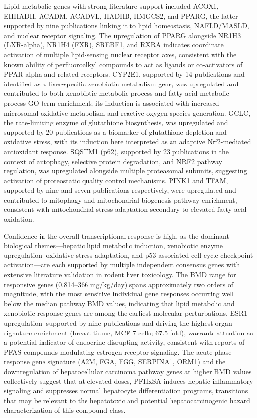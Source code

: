 Lipid metabolic genes with strong literature support included ACOX1, EHHADH, ACADM, ACADVL, HADHB, HMGCS2, and PPARG, the latter supported by nine publications linking it to lipid homeostasis, NAFLD/MASLD, and nuclear receptor signaling. The upregulation of PPARG alongside NR1H3 (LXR-alpha), NR1H4 (FXR), SREBF1, and RXRA indicates coordinate activation of multiple lipid-sensing nuclear receptor axes, consistent with the known ability of perfluoroalkyl compounds to act as ligands or co-activators of PPAR-alpha and related receptors. CYP2E1, supported by 14 publications and identified as a liver-specific xenobiotic metabolism gene, was upregulated and contributed to both xenobiotic metabolic process and fatty acid metabolic process GO term enrichment; its induction is associated with increased microsomal oxidative metabolism and reactive oxygen species generation. GCLC, the rate-limiting enzyme of glutathione biosynthesis, was upregulated and supported by 20 publications as a biomarker of glutathione depletion and oxidative stress, with its induction here interpreted as an adaptive Nrf2-mediated antioxidant response. SQSTM1 (p62), supported by 23 publications in the context of autophagy, selective protein degradation, and NRF2 pathway regulation, was upregulated alongside multiple proteasomal subunits, suggesting activation of proteostatic quality control mechanisms. PINK1 and TFAM, supported by nine and seven publications respectively, were upregulated and contributed to mitophagy and mitochondrial biogenesis pathway enrichment, consistent with mitochondrial stress adaptation secondary to elevated fatty acid oxidation.

Confidence in the overall transcriptional response is high, as the dominant biological themes—hepatic lipid metabolic induction, xenobiotic enzyme upregulation, oxidative stress adaptation, and p53-associated cell cycle checkpoint activation—are each supported by multiple independent consensus genes with extensive literature validation in rodent liver toxicology. The BMD range for responsive genes (0.814–366 mg/kg/day) spans approximately two orders of magnitude, with the most sensitive individual gene responses occurring well below the median pathway BMD values, indicating that lipid metabolic and xenobiotic response genes are among the earliest molecular perturbations. ESR1 upregulation, supported by nine publications and driving the highest organ signature enrichment (breast tissue, MCF-7 cells; 67.5-fold), warrants attention as a potential indicator of endocrine-disrupting activity, consistent with reports of PFAS compounds modulating estrogen receptor signaling. The acute-phase response gene signature (A2M, FGA, FGG, SERPINA1, ORM1) and the downregulation of hepatocellular carcinoma pathway genes at higher BMD values collectively suggest that at elevated doses, PFHxSA induces hepatic inflammatory signaling and suppresses normal hepatocyte differentiation programs, transitions that may be relevant to the hepatotoxic and potential hepatocarcinogenic hazard characterization of this compound class.

